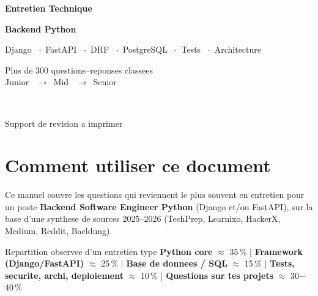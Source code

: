 \documentclass[11pt,a4paper]{article}
\begin{document}
\begin{titlepage}
\centering
\vspace*{2.5cm}
{\color{primary}\Huge\bfseries Entretien Technique\par}
\vspace{0.4cm}
{\color{primary}\Huge\bfseries Backend Python\par}
\vspace{0.6cm}
{\color{accent}\LARGE Django \ $\cdot$\ FastAPI \ $\cdot$\ DRF \ $\cdot$\ PostgreSQL \ $\cdot$\ Tests \ $\cdot$\ Architecture\par}
\vspace{1.2cm}
{\large Plus de 300 questions--reponses classees\\
Junior \ $\rightarrow$\ Mid \ $\rightarrow$\ Senior\par}
\vspace{1cm}

\textcolor{white}{\colorbox{junior}{\small\bfseries\ JUNIOR\ }}\quad
\textcolor{white}{\colorbox{mid}{\small\bfseries\ MID\ }}\quad
\textcolor{white}{\colorbox{senior}{\small\bfseries\ SENIOR\ }}

\vfill
{\color{codecom}\large Support de revision a imprimer\par}
\vspace{2cm}
\end{titlepage}

\tableofcontents
\newpage

\section{Comment utiliser ce document}
Ce manuel couvre les questions qui reviennent le plus souvent en entretien pour
un poste \textbf{Backend Software Engineer Python} (Django et/ou FastAPI), sur
la base d'une synthese de sources 2025--2026 (TechPrep, Learnixo, HackerX,
Medium, Reddit, Baeldung).

\begin{infobox}{Repartition observee d'un entretien type}
\textbf{Python core} $\approx$ 35\,\% \quad $\vert$ \quad
\textbf{Framework (Django/FastAPI)} $\approx$ 25\,\% \quad $\vert$ \quad
\textbf{Base de donnees / SQL} $\approx$ 15\,\% \quad $\vert$ \quad
\textbf{Tests, securite, archi, deploiement} $\approx$ 10\,\% \quad $\vert$ \quad
\textbf{Questions sur tes projets} $\approx$ 30$-$40\,\%
\end{infobox}
\end{document}
